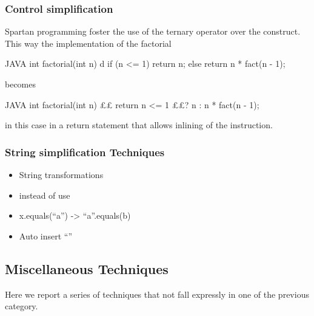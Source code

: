 \subsubsection{Control simplification}
Spartan programming foster the use of the ternary operator over the
 construct.  This way the implementation of the factorial
\begin{code}{JAVA}
int factorial(int n) {d
    if (n <= 1)
        return n;
    else
        return n * fact(n - 1);
}
\end{code}
becomes
\begin{code}{JAVA}
int factorial(int n) {££
  return n <= 1 ££? n : n * fact(n - 1);
}
\end{code}
in this case in a return statement that allows inlining of the instruction.

\subsubsection{String simplification Techniques}
\begin{itemize}
  \item String transformations
  \item instead of  use 
  \item x.equals(“a”) -> “a”.equals(b)
  \item Auto insert “”
\end{itemize}

\subsection{Miscellaneous Techniques}

Here we report a series of techniques that not fall expressly in one of the
previous category.

